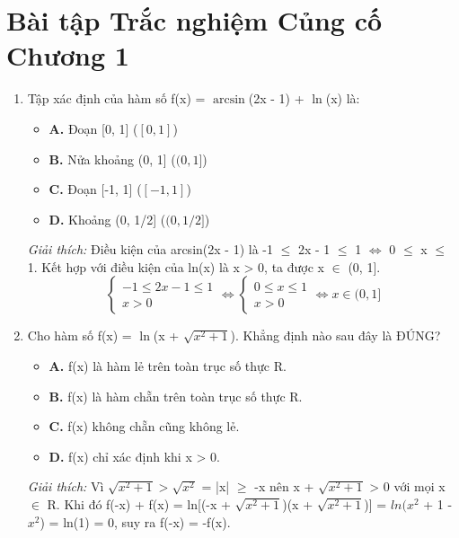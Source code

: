 \documentclass[11pt,a4paper,oneside]{book}
\begin{document}
\section{Bài tập Trắc nghiệm Củng cố Chương 1}
\begin{enumerate}[label=\textbf{Câu \arabic*:}, leftmargin=2.2em, itemsep=8pt]
  \item Tập xác định của hàm số f(x) = $\arcsin$(2x - 1) + $\ln$(x) là:
  \begin{itemize}[label={}, leftmargin=1em, itemsep=2pt]
    \item \textbf{A.} Đoạn [0, 1] \quad ($[0, 1]$)
    \item \textbf{B.} Nửa khoảng (0, 1] \quad ($(0, 1]$)
    \item \textbf{C.} Đoạn [-1, 1] \quad ($[-1, 1]$)
    \item \textbf{D.} Khoảng (0, 1/2] \quad ($(0, 1/2]$)
  \end{itemize}
  \vspace{2pt}
   \textit{Giải thích:} Điều kiện của arcsin(2x - 1) là -1 $\le$  2x - 1 $\le$  1 $\iff$  0 $\le$  x $\le$  1. Kết hợp với điều kiện của ln(x) là x > 0, ta được x $\in$  (0, 1].
  \[ \begin{cases} -1 \le 2x - 1 \le 1 \\ x > 0 \end{cases} \iff \begin{cases} 0 \le x \le 1 \\ x > 0 \end{cases} \iff x \in (0, 1] \]
  \item Cho hàm số f(x) = $\ln$(x + $\sqrt{x^2 + 1}$). Khẳng định nào sau đây là ĐÚNG?
  \begin{itemize}[label={}, leftmargin=1em, itemsep=2pt]
    \item \textbf{A.} f(x) là hàm lẻ trên toàn trục số thực R.
    \item \textbf{B.} f(x) là hàm chẵn trên toàn trục số thực R.
    \item \textbf{C.} f(x) không chẵn cũng không lẻ.
    \item \textbf{D.} f(x) chỉ xác định khi x > 0.
  \end{itemize}
  \vspace{2pt}
   \textit{Giải thích:} Vì $\sqrt{x^2 + 1} > \sqrt{x^2}$ = |x| $\ge$  -x nên x + $\sqrt{x^2 + 1}$ > 0 với mọi x $\in$  R. Khi đó f(-x) + f(x) = ln[(-x + $\sqrt{x^2+1}$)(x + $\sqrt{x^2+1}$)] = $ln(x^2$ + 1 - $x^2$) = ln(1) = 0, suy ra f(-x) = -f(x).

\end{enumerate}
\end{document}
